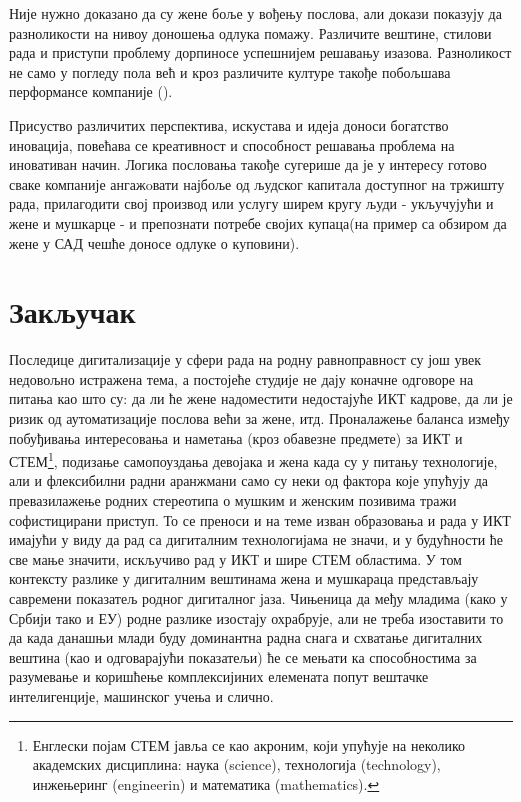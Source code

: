 \documentclass[a4paper]{article}
\begin{document}
Није нужно доказано да су жене боље у вођењу послова, али докази показују да разноликости 
на нивоу доношења одлука помажу. Различите вештине, стилови рада и приступи проблему 
дорпиносе успешнијем решавању изазова. Разноликост не само у погледу пола већ и 
кроз различите културе такође побољшава перформансе компаније (\cite{kultura}). 

Присуство различитих перспектива, искустава и идеја доноси богатство иновација, 
повећава се креативност и способност решавања проблема на иновативан начин. 
Логика пословања такође сугерише да је у интересу готово сваке компаније 
ангажoвати најбоље од људског капитала доступног на тржишту рада, прилагодити свој
производ или услугу ширем кругу људи - укључујући и жене и мушкарце - и препознати
потребе својих купаца(на пример са обзиром да жене у САД чешће доносе одлуке о 
куповини).


\section{Закључак}
\label{sec:zakljucak}

Последице дигитализације у сфери рада на родну равноправност су још увек
недовољно истражена тема, а постојеће студије не дају коначне одговоре на питања као што
су: да ли ће жене надоместити недостајуће ИКТ кадрове, да ли је ризик од аутоматизације
послова већи за жене, итд. 
Проналажење баланса између побуђивања интересовања и наметања (кроз обавезне
предмете) за ИКТ и СТЕМ\footnote{Енглески појам СТЕМ јавља се као акроним, који упућује на 
неколико академских дисциплина: наука (science), технологија (technology), инжењеринг (engineerin)
и математика (mathematics).}, подизање самопоуздања девојака и жена када су у питању
технологије, али и флексибилни радни аранжмани само су неки од фактора које упућују да
превазилажење родних стереотипа о мушким и женским позивима тражи софистицирани приступ.
То се преноси и на теме изван образовања и рада у ИКТ имајући у виду да рад са дигиталним
технологијама не значи, и у будућности ће све мање значити, искључиво рад у ИКТ и шире
СТЕМ областима. У том контексту разлике у дигиталним вештинама жена и мушкараца
представљају савремени показатељ родног дигиталног јаза. Чињеница да међу младима
(како у Србији тако и ЕУ) родне разлике изостају охрабрује, али не треба изоставити то да
када данашњи млади буду доминантна радна снага и схватање дигиталних вештина (као и
одговарајући показатељи) ће се мењати ка способностима за разумевање и коришћење
комплексијиних елемената попут вештачке интелигенције, машинског учења и слично. 

\newpage
{}
\appendix
 

%
\end{document}
